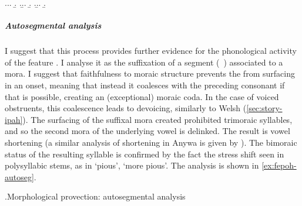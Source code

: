 \ex.\a.\a.
\b.
\z.\b.\a.
\b.
\z.\b.\a.
\b.

\subparagraph{Autosegmental analysis}
\label{sec:analysis-3}

I suggest that this process provides further evidence for the phonological activity of the feature . I analyse it as the suffixation of a  segment (\ie\ \ipa{[h]}) associated to a mora. I suggest that faithfulness to moraic structure prevents the \ipa{[h]} from surfacing in an onset, meaning that instead it coalesces with the preceding consonant if that is possible, creating an (exceptional) moraic coda. In the case of voiced obstruents, this coalescence leads to devoicing, similarly to Welsh \ipa{[h]} (\cref{sec:story-ipah}). The surfacing of the suffixal mora created prohibited trimoraic syllables, and so the second mora of the underlying vowel is delinked. The result is vowel shortening (a similar analysis of shortening in Anywa is given by \citealp{trommer10:_gener}). The bimoraic status of the resulting syllable is confirmed by the fact the stress shift seen in polysyllabic stems, as in \ipa{[ˈdɛvɒd̥]} `pious', \ipa{[dɛˈvɒtɒh]} `more pious'. The analysis is shown in \cref{ex:fepoh-autoseg}.

\ex.\label{ex:fepoh-autoseg}Morphological provection: autosegmental analysis\\


